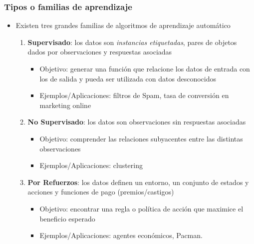 \documentclass[leqno, 10pt, envcountsect]{beamer}
\numberwithin{equation}{section}
\theoremstyle{definition}
\theoremstyle{example}
\numberwithin{figure}{section}
\numberwithin{table}{section}
\let\olditem\item
\renewcommand{\item}{%
\olditem\vspace{1pt}}
\begin{document}
\begin{frame}[fragile=singleslide]
  \frametitle{Tipos o familias de aprendizaje}
  \begin{itemize}
    \item Existen tres grandes familias de algoritmos de aprendizaje automático
      \begin{enumerate}
        \item \textbf{Supervisado}: los datos son \textit{instancias
          etiquetadas}, pares de objetos dados por observaciones y respuestas
          asociadas
          \begin{itemize}
            \item Objetivo: generar una función que relacione los datos de
              entrada con los de salida y pueda ser utilizada con datos
              desconocidos
          \item Ejemplos/Aplicaciones: filtros de Spam, tasa de conversión en
            marketing online
          \end{itemize}
        \item \textbf{No Supervisado}: los datos son observaciones sin
          respuestas asociadas
          \begin{itemize}
            \item Objetivo: comprender las relaciones subyacentes entre las
              distintas observaciones
          \item Ejemplos/Aplicaciones: clustering
          \end{itemize}
        \item \textbf{Por Refuerzos}: los datos definen un entorno, un conjunto
          de estados y acciones y funciones de pago (premios/castigos)
        \begin{itemize}
          \item Objetivo: encontrar una regla o política de acción que maximice
            el beneficio esperado
          \item Ejemplos/Aplicaciones: agentes económicos, Pacman.
        \end{itemize}
      \end{enumerate}
  \end{itemize}
  \begin{center}

\end{center}
\end{frame}
\end{document}
